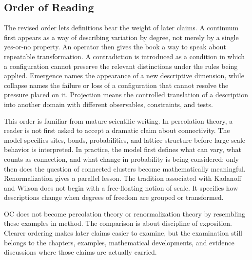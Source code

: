 \documentclass[11pt,a4paper,openany]{book}
\begin{document}
\subsection{Order of Reading}
The revised order lets definitions bear the weight of later claims. A continuum first appears as a way of describing variation by degree, not merely by a single yes-or-no property. An operator then gives the book a way to speak about repeatable transformation. A contradiction is introduced as a condition in which a configuration cannot preserve the relevant distinctions under the rules being applied. Emergence names the appearance of a new descriptive dimension, while collapse names the failure or loss of a configuration that cannot resolve the pressure placed on it. Projection means the controlled translation of a description into another domain with different observables, constraints, and tests. \cite{grimmett_percolation,goldenfeld_lectures}\par
This order is familiar from mature scientific writing. In percolation theory, a reader is not first asked to accept a dramatic claim about connectivity. The model specifies sites, bonds, probabilities, and lattice structure before large-scale behavior is interpreted. In practice, the model first defines what can vary, what counts as connection, and what change in probability is being considered; only then does the question of connected clusters become mathematically meaningful. Renormalization gives a parallel lesson. The tradition associated with Kadanoff and Wilson does not begin with a free-floating notion of scale. It specifies how descriptions change when degrees of freedom are grouped or transformed.\par
OC does not become percolation theory or renormalization theory by resembling these examples in method. The comparison is about discipline of exposition. Clearer ordering makes later claims easier to examine, but the examination still belongs to the chapters, examples, mathematical developments, and evidence discussions where those claims are actually carried.\par
\end{document}
